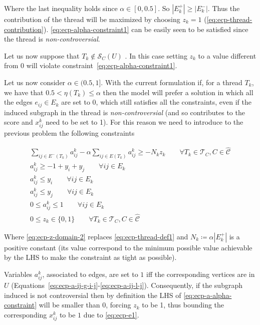 Where the last inequality holds since $\alpha \in [0, 0.5]$. So $|E^{+} _k| \geq
	|E^{-} _k|$. Thus the contribution of the thread will be maximized by
choosing $z_k = 1$ (\autoref{eq:ecp-thread-contribution}).
\autoref{eq:ecp-alpha-constraint1} can be easily seen to be satisfied since the
thread is \emph{non-controversial}.

Let us now suppose that $T_k \not\in \mathcal{S}_{C}(U)  $ . In this case setting $z_k$ to a value
different from $0$ will violate constraint~\ref{eq:ecp-alpha-constraint1}.

\bigskip

Let us now consider $\alpha \in (0.5, 1]$. With the current formulation if, for
a thread $T_k$, we have that $0.5 < \eta(T_k) \leq \alpha $ then the model will
prefer a solution in which all the edges $e_{ij} \in E_k$ are set to $0$, which
still satisfies all the constraints, even if the induced subgraph in the thread
is \emph{non-controversial} (and so contributes to the score and $x_{ij}^{k}  $
need to be set to 1). For this reason we need to introduce to the previous
problem the following constraints

\begin{gather}
	\label{eq:ecp-a-alpha-constraint}
	\sum^{}_{ij \in E^{-} (T_k)} a_{ij}^{k}  - \alpha \sum^{}_{ij \in E(T_k)}
	a_{ij} ^{k} \geq - N_{k} z_{k}  \quad\quad \forall T_{k} \in \mathcal{T} _{C}, C \in
	\hat{\mathcal{C}} \\
	\label{eq:ecp-a-ij-g-i-j}
	a_{ij}^{k} \geq -1 + y_i + y_j \quad\quad \forall ij \in E_k \\
	\label{eq:ecp-a-ij-l-i}
	a_{ij}^{k} \leq y_i\quad\quad \forall ij \in E_k \\
	\label{eq:ecp-a-ij-l-j}
	a_{ij}^{k} \leq y_j \quad\quad \forall ij \in E_k \\
	\label{eq:ecp-a-domain-2}
	0 \leq a_{ij}^{k} \leq 1 \quad\quad \forall ij \in E_k \\
	\label{eq:ecp-z-domain-2}
	0 \leq z _{k} \in  \{0, 1\} \quad\quad \forall T_{k} \in \mathcal{T} _{C}, C \in
	\hat{\mathcal{C}}
\end{gather}

Where \autoref{eq:ecp-z-domain-2} replaces \autoref{eq:ecp-thread-def1} and
$N_k \coloneqq \alpha |E^{+}_k| $ is a positive constant (its value correspond
to the minimum possible value achievable by the LHS to make the constraint as
tight as possible).

Variables $a_{ij}^{k}  $, associated to edges, are set to $1$ iff the
corresponding vertices are in $U$
(Equations~\ref{eq:ecp-a-ij-g-i-j}-\ref{eq:ecp-a-ij-l-j}). Consequently, if the
subgraph induced is not controversial then by definition the LHS of
\autoref{eq:ecp-a-alpha-constraint} will be smaller than $0$, forcing $z_k$ to
be 1, thus bounding the corresponding $x_{ij} ^{k} $ to be $1$ due to
\autoref{eq:ecp-e1}.


